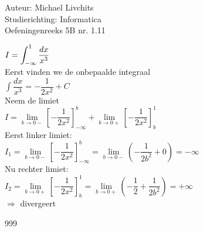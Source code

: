 \documentclass[a4paper]{article}
\newcommand{\dint}{\displaystyle\int}
\begin{document}
  
\noindent \large Auteur: Michael Livchits \\
\noindent \large Studierichting: Informatica\\
\noindent \large Oefeningenreeks 5B nr. 1.11\\

\medskip

\normalsize

$I = \displaystyle\dint_{-\infty}^{1} \dfrac{dx}{x^3}$\\

Eerst vinden we de onbepaalde integraal\\

$\displaystyle\int \dfrac{dx}{x^3} = -\dfrac{1}{2x^2} + C$\\

Neem de limiet\\

$I = \lim\limits_{b\rightarrow 0-}\left[-\dfrac{1}{2x^2}\right]_{-\infty}^{b} + \lim\limits_{b\rightarrow 0+}\left[-\dfrac{1}{2x^2}\right]_{b}^{1}$\\

Eerst linker limiet:\\

$I_1 = \lim\limits_{b\rightarrow 0-}\left[-\dfrac{1}{2x^2}\right]_{-\infty}^{b} = \lim\limits_{b\rightarrow 0-}\left(-\dfrac{1}{2b^2} + 0\right) = -\infty$\\

Nu rechter limiet:\\

$I_2 = \lim\limits_{b\rightarrow 0+}\left[-\dfrac{1}{2x^2}\right]_{b}^{1} = \lim\limits_{b\rightarrow 0+}\left(-\dfrac{1}{2} + \dfrac{1}{2b^2}\right) = +\infty$\\

$\Rightarrow$ divergeert\\

\begin{thebibliography}{999}
\end{thebibliography}
\end{document}
